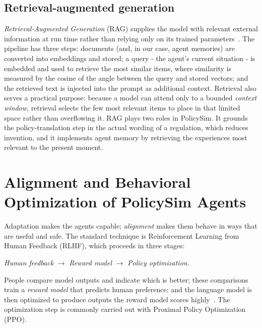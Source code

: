 \documentclass[conference]{IEEEtran}
\begin{document}
\subsection{Retrieval-augmented generation}
\emph{Retrieval-Augmented Generation} (RAG) supplies the model with relevant external information at run time rather than relying only on its trained parameters~\cite{lewis2020}. The pipeline has three steps: documents (and, in our case, agent memories) are converted into embeddings and stored; a query - the agent's current situation - is embedded and used to retrieve the most similar items, where similarity is measured by the cosine of the angle between the query and stored vectors; and the retrieved text is injected into the prompt as additional context. Retrieval also serves a practical purpose: because a model can attend only to a bounded \emph{context window}, retrieval selects the few most relevant items to place in that limited space rather than overflowing it. RAG plays two roles in PolicySim. It grounds the policy-translation step in the actual wording of a regulation, which reduces invention, and it implements agent memory by retrieving the experiences most relevant to the present moment.

\section{Alignment and Behavioral Optimization of PolicySim Agents}
\label{sec:align}

Adaptation makes the agents capable; \emph{alignment} makes them behave in ways that are useful and safe. The standard technique is Reinforcement Learning from Human Feedback (RLHF), which proceeds in three stages:
\begin{center}
\textit{Human feedback} $\rightarrow$ \textit{Reward model} $\rightarrow$ \textit{Policy optimization}.
\end{center}
People compare model outputs and indicate which is better; these comparisons train a \emph{reward model} that predicts human preference; and the language model is then optimized to produce outputs the reward model scores highly~\cite{christiano2017,ouyang2022}. The optimization step is commonly carried out with Proximal Policy Optimization (PPO).
\end{document}
